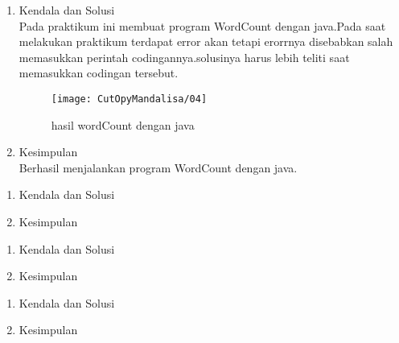 \begin{enumerate}
\item Kendala dan Solusi\\
Pada praktikum ini membuat program WordCount dengan java.Pada saat melakukan praktikum terdapat error akan tetapi erorrnya disebabkan salah memasukkan perintah codingannya.solusinya harus lebih teliti saat memasukkan codingan tersebut.

\begin{figure}[!ht]
\texttt{[image: CutOpyMandalisa/04]}
\caption{hasil wordCount dengan java}
\label{gam:perkuliahan-25-11}
\end{figure}

\item Kesimpulan\\
Berhasil menjalankan program WordCount dengan java.
\end{enumerate}


\begin{enumerate}
\item Kendala dan Solusi

\item Kesimpulan
\end{enumerate}


\begin{enumerate}
\item Kendala dan Solusi

\item Kesimpulan
\end{enumerate}

\begin{enumerate}
\item Kendala dan Solusi

\item Kesimpulan
\end{enumerate}